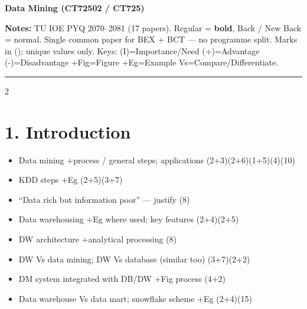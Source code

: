\documentclass[10pt]{article}
\begin{document}
\begin{center}
  {\Large\bfseries Data Mining (CT72502 / CT725)} 
\end{center}
\vspace{2pt}
\small
\textbf{Notes:} TU IOE PYQ 2070--2081 (17 papers). Regular = \textbf{bold}, Back / New Back = normal.
Single common paper for BEX + BCT --- no programme split.
Marks in (); unique values only.
Keys: (I)=Importance/Need \quad (+)=Advantage \quad (-)=Disadvantage \quad +Fig=Figure \quad +Eg=Example \quad Vs=Compare/Differentiate.
\vspace{2pt}
\hrule
\vspace{4pt}

\begin{multicols}{2}
\footnotesize

\section*{1. Introduction}
\begin{itemize}
  \item Data mining +process / general steps; applications \hfill (2+3)(2+6)(1+5)(4)(10)
  \item KDD steps +Eg \hfill (2+5)(3+7)
  \item ``Data rich but information poor'' --- justify \hfill (8)
  \item Data warehousing +Eg where used; key features \hfill (2+4)(2+5)
  \item DW architecture +analytical processing \hfill (8)
  \item DW Vs data mining; DW Vs database (similar too) \hfill (3+7)(2+2)
  \item DM system integrated with DB/DW +Fig process \hfill (4+2)
  \item Data warehouse Vs data mart; snowflake scheme +Eg \hfill (2+4)(15)
\end{itemize}


\end{multicols}
\end{document}
